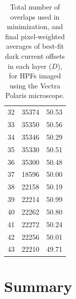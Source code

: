 \documentclass[letterpaper,11pt]{article}
\begin{document}
\begin{table}[!htb]
\begin{tabular}{c c c}
32          & 35374              & 50.53 \\
33          & 35350              & 50.56 \\
34          & 35346              & 50.29 \\
35          & 35330              & 50.51 \\
36          & 35300              & 50.48 \\
37          & 18596              & 50.00 \\
38          & 22158              & 50.19 \\
39          & 22214              & 50.99 \\
40          & 22262              & 50.80 \\
41          & 22272              & 50.24 \\
42          & 22256              & 50.01 \\
43          & 22210              & 49.71 \\
\hline
\end{tabular}
\caption{\footnotesize Total number of overlaps used in minimization, and final pixel-weighted averages of best-fit dark current offsets in each layer ($D$), for HPFs imaged using the Vectra Polaris microscope.}
\label{tab:best_offsets_polaris}
\end{table}

\clearpage

\section{Summary}
\label{sec:summary}

\clearpage

\end{document}
